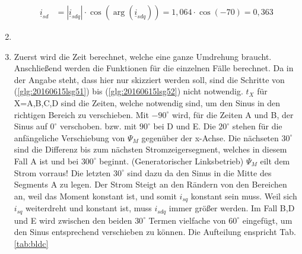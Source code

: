 \begin{solution}
\begin{enumerate}
\begin{align}
			\underline{i}_{sd} & = |\underline{i}_{sdq}| \cdot \cos(\arg(\underline{i}_{sdq}))=1,064 \cdot \cos(-70)=0,363
		\end{align}
		\item 
		\begin{figure}[H]
			\label{fig:20160615lsg13}
		\end{figure}
		\item Zuerst wird die Zeit berechnet, welche eine ganze Umdrehung braucht. Anschließend werden die Funktionen für die einzelnen Fälle berechnet. Da in der Angabe steht, dass hier nur skizziert werden soll, sind die Schritte von (\ref{glg:20160615lsg51}) bis (\ref{glg:20160615lsg52}) nicht notwendig. $t_X$ für X=A,B,C,D sind die Zeiten, welche notwendig sind, um den Sinus in den richtigen Bereich zu verschieben. Mit $-90^\circ$ wird, für die Zeiten A und B, der Sinus auf $0^\circ$ verschoben. bzw. mit $90^\circ$ bei D und E. Die $20^\circ$ stehen für die anfängeliche Verschiebung von $\Psi_M$ gegenüber der x-Achse. Die nächseten $30^\circ$ sind die Differenz bis zum nächsten Stromzeigersegment, welches in diesem Fall A ist und bei $300^\circ$ beginnt. (Generatorischer Linksbetrieb) $\Psi_M$ eilt dem Strom vorraus! Die letzten $30^\circ$ sind dazu da den Sinus in die Mitte des Segments A zu legen. Der Strom Steigt an den Rändern von den Bereichen an, weil das Moment konstant ist, und somit $i_{sq}$ konstant sein muss. Weil sich $i_{sq}$ weiterdreht und konstant ist, muss $i_{sdq}$ immer größer werden. Im Fall B,D und E wird zwischen den beiden $30^\circ$ Termen vielfache von $60^\circ$ eingefügt, um den Sinus entsprechend verschieben zu können. Die Aufteilung enspricht Tab.\ref{tab:bldc} 

\end{enumerate}
\end{solution}
